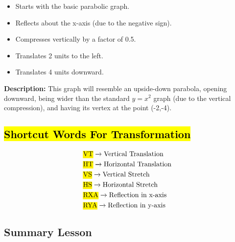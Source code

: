 \documentclass[12pt,a4paper]{article}
\begin{document}
\begin{itemize}
    \item Starts with the basic parabolic graph.
    \item Reflects about the x-axis (due to the negative sign).
    \item Compresses vertically by a factor of 0.5.
    \item Translates 2 units to the left.
    \item Translates 4 units downward.
\end{itemize}

\textbf{Description:} This graph will resemble an upside-down parabola, opening downward, being wider than the standard \(y = x^2\) graph (due to the vertical compression), and having its vertex at the point (-2,-4).

\subsection*{\hl{Shortcut Words For Transformation}}
\begin{align*}
    & \text{\hl{VT}} \xrightarrow{} \text{Vertical Translation} \\
    & \text{\hl{HT}} \xrightarrow{} \text{Horizontal Translation} \\
    & \text{\hl{VS}} \xrightarrow{} \text{Vertical Stretch} \\
    & \text{\hl{HS}} \xrightarrow{} \text{Horizontal Stretch} \\
    & \text{\hl{RXA}} \xrightarrow{} \text{Reflection in x-axis} \\
    & \text{\hl{RYA}} \xrightarrow{} \text{Reflection in y-axis} \\
\end{align*}

\subsection*{Summary Lesson}
\end{document}
